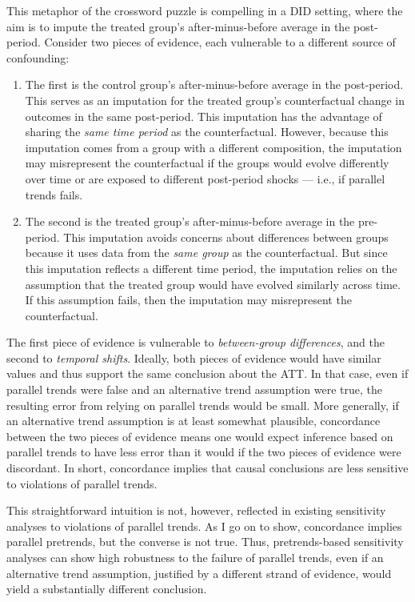 \documentclass[twoside,11pt]{article}
\begin{document}
This metaphor of the crossword puzzle is compelling in a DID setting, where the aim is to impute the treated group's after-minus-before average in the post-period. Consider two pieces of evidence, each vulnerable to a different source of confounding:

\begin{enumerate}

\item The first is the control group's after-minus-before average in the post-period. This serves as an imputation for the treated group's counterfactual change in outcomes in the same post-period. This imputation has the advantage of sharing the \textit{same time period} as the counterfactual. However, because this imputation comes from a group with a different composition, the imputation may misrepresent the counterfactual if the groups would evolve differently over time or are exposed to different post-period shocks --- i.e., if parallel trends fails.

\item The second is the treated group's after-minus-before average in the pre-period. This imputation avoids concerns about differences between groups because it uses data from the \textit{same group} as the counterfactual. But since this imputation reflects a different time period, the imputation relies on the assumption that the treated group would have evolved similarly across time. If this assumption fails, then the imputation may misrepresent the counterfactual.

\end{enumerate}

The first piece of evidence is vulnerable to \textit{between-group differences}, and the second to \textit{temporal shifts}. Ideally, both pieces of evidence would have similar values and thus support the same conclusion about the \textrm{ATT}. In that case, even if parallel trends were false and an alternative trend assumption were true, the resulting error from relying on parallel trends would be small. More generally, if an alternative trend assumption is at least somewhat plausible, concordance between the two pieces of evidence means one would expect inference based on parallel trends to have less error than it would if the two pieces of evidence were discordant. In short, concordance implies that causal conclusions are less sensitive to violations of parallel trends.

This straightforward intuition is not, however, reflected in existing sensitivity analyses to violations of parallel trends. As I go on to show, concordance implies parallel pretrends, but the converse is not true. Thus, pretrends-based sensitivity analyses can show high robustness to the failure of parallel trends, even if an alternative trend assumption, justified by a different strand of evidence, would yield a substantially different conclusion.
\end{document}
